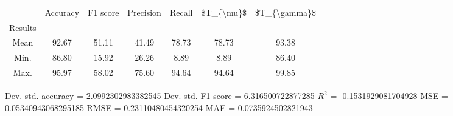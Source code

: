\begin{tabular}{|c|c|c|c|c|c|c|}
\toprule
{} &  Accuracy &  F1 score &  Precision &  Recall &  \$T\_\{\textbackslash mu\}\$ &  \$T\_\{\textbackslash gamma\}\$ \\
Results &           &           &            &         &            &               \\
\hline
Mean    &     92.67 &     51.11 &      41.49 &   78.73 &      78.73 &         93.38 \\
Min.    &     86.80 &     15.92 &      26.26 &    8.89 &       8.89 &         86.40 \\
Max.    &     95.97 &     58.02 &      75.60 &   94.64 &      94.64 &         99.85 \\
\bottomrule
\end{tabular}

 Dev. std. accuracy = 2.0992302983382545
 Dev. std. F1-score = 6.316500722877285
 $R^2$ = -0.1531929081704928
 MSE = 0.05340943068295185
 RMSE = 0.23110480454320254
 MAE = 0.0735924502821943